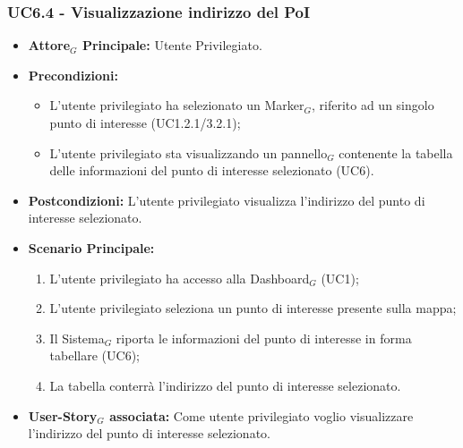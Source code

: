\documentclass[10pt]{article}
\begin{document}
\begin{justify}
 \subsubsection{\textbf{UC6.4 - Visualizzazione indirizzo del PoI}}
 \begin{itemize}
     \item \textbf{Attore$_G$ Principale:} Utente Privilegiato.
     \item \textbf{Precondizioni:}
       \begin{itemize}
    	        \item L'utente privilegiato ha selezionato un Marker$_G$, riferito ad un singolo punto di interesse (UC1.2.1/3.2.1);
          \item L'utente privilegiato sta visualizzando un pannello$_G$ contenente la tabella delle informazioni del punto di interesse selezionato (UC6).
       \end{itemize}
     \item \textbf{Postcondizioni:} L'utente privilegiato visualizza l'indirizzo del punto di interesse selezionato.
     \item \textbf{Scenario Principale:}
        \begin{enumerate}
            \item L'utente privilegiato ha accesso alla Dashboard$_G$ (UC1);
            \item L'utente privilegiato seleziona un punto di interesse presente sulla mappa;
            \item Il Sistema$_G$ riporta le informazioni del punto di interesse in forma tabellare (UC6);
            \item La tabella conterrà l'indirizzo del punto di interesse selezionato.
        \end{enumerate}
     \item \textbf{User-Story$_G$ associata:} Come utente privilegiato voglio visualizzare l'indirizzo del punto di interesse selezionato. 
 \end{itemize}

\end{justify}
\end{document}
